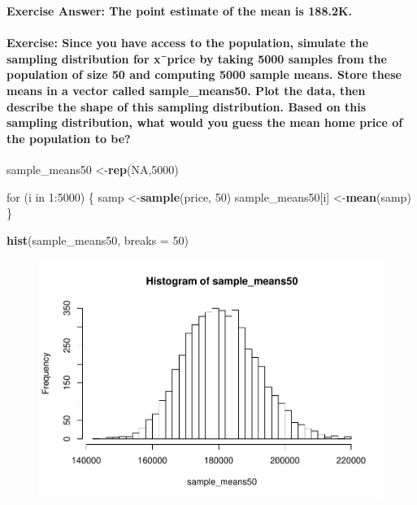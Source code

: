 \documentclass[]{article}
\newenvironment{Shaded}{\begin{snugshade}}{\end{snugshade}}
\newcommand{\KeywordTok}[1]{\textcolor[rgb]{0.13,0.29,0.53}{\textbf{{#1}}}}
\newcommand{\DataTypeTok}[1]{\textcolor[rgb]{0.13,0.29,0.53}{{#1}}}
\newcommand{\DecValTok}[1]{\textcolor[rgb]{0.00,0.00,0.81}{{#1}}}
\newcommand{\OtherTok}[1]{\textcolor[rgb]{0.56,0.35,0.01}{{#1}}}
\newcommand{\NormalTok}[1]{{#1}}
\begin{document}
\textbf{Exercise Answer: The point estimate of the mean is 188.2K.}

\paragraph{Exercise: Since you have access to the population, simulate
the sampling distribution for x¯price by taking 5000 samples from the
population of size 50 and computing 5000 sample means. Store these means
in a vector called sample\_means50. Plot the data, then describe the
shape of this sampling distribution. Based on this sampling
distribution, what would you guess the mean home price of the population
to
be?}\label{exercise-since-you-have-access-to-the-population-simulate-the-sampling-distribution-for-xprice-by-taking-5000-samples-from-the-population-of-size-50-and-computing-5000-sample-means.-store-these-means-in-a-vector-called-sampleux5fmeans50.-plot-the-data-then-describe-the-shape-of-this-sampling-distribution.-based-on-this-sampling-distribution-what-would-you-guess-the-mean-home-price-of-the-population-to-be}

\begin{Shaded}
\begin{Highlighting}[]
\NormalTok{sample_means50 <-}\KeywordTok{rep}\NormalTok{(}\OtherTok{NA}\NormalTok{,}\DecValTok{5000}\NormalTok{)}

\NormalTok{for (i in }\DecValTok{1}\NormalTok{:}\DecValTok{5000}\NormalTok{)}
\NormalTok{\{}
     \NormalTok{samp <-}\KeywordTok{sample}\NormalTok{(price, }\DecValTok{50}\NormalTok{)}
     \NormalTok{sample_means50[i] <-}\KeywordTok{mean}\NormalTok{(samp)}
\NormalTok{\}}

\KeywordTok{hist}\NormalTok{(sample_means50, }\DataTypeTok{breaks =} \DecValTok{50}\NormalTok{)}
\end{Highlighting}
\end{Shaded}

\begin{figure}[htbp]
\centering
\includegraphics{Lab3A_files/figure-latex/CreateSampleMeans50DistPrice-1.pdf}
\caption{}
\end{figure}
\end{document}
